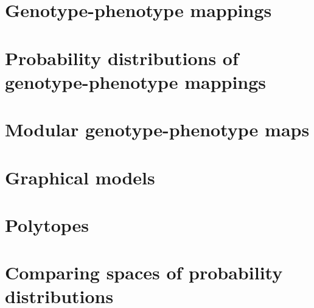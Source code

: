 

%

\newtoggle{thmsty}
\togglefalse{thmsty}

\newtoggle{longpres}
\togglefalse{longpres}









	\begin{frame}
		\titlepage
	\end{frame}
	
	\section[GP maps]{Genotype-phenotype mappings}
	
		
	\section[PDs of GPs]{Probability distributions of genotype-phenotype mappings}
    

	\section[Modular GPs]{Modular genotype-phenotype maps}
	
	
%	

	\section{Graphical models}
	

	\section{Polytopes}
		

	\section[PD comp]{Comparing spaces of probability distributions}
%	
	

%	
	
	
